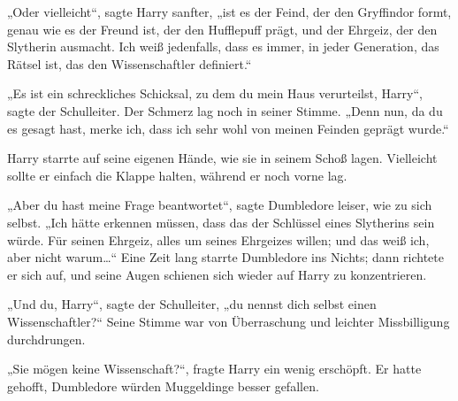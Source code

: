 „Oder vielleicht“, sagte Harry sanfter, „ist es der Feind, der den Gryffindor formt, genau wie es der Freund ist, der den Hufflepuff prägt, und der Ehrgeiz, der den Slytherin ausmacht. Ich weiß jedenfalls, dass es immer, in jeder Generation, das Rätsel ist, das den Wissenschaftler definiert.“

„Es ist ein schreckliches Schicksal, zu dem du mein Haus verurteilst, Harry“, sagte der Schulleiter. Der Schmerz lag noch in seiner Stimme. „Denn nun, da du es gesagt hast, merke ich, dass ich sehr wohl von meinen Feinden geprägt wurde.“

Harry starrte auf seine eigenen Hände, wie sie in seinem Schoß lagen. Vielleicht sollte er einfach die Klappe halten, während er noch vorne lag.

„Aber du hast meine Frage beantwortet“, sagte Dumbledore leiser, wie zu sich selbst. „Ich hätte erkennen müssen, dass das der Schlüssel eines Slytherins sein würde. Für seinen Ehrgeiz, alles um seines Ehrgeizes willen; und das weiß ich, aber nicht warum…“ Eine Zeit lang starrte Dumbledore ins Nichts; dann richtete er sich auf, und seine Augen schienen sich wieder auf Harry zu konzentrieren.

„Und du, Harry“, sagte der Schulleiter, „du nennst dich selbst einen Wissenschaftler?“ Seine Stimme war von Überraschung und leichter Missbilligung durchdrungen.

„Sie mögen keine Wissenschaft?“, fragte Harry ein wenig erschöpft. Er hatte gehofft, Dumbledore würden Muggeldinge besser gefallen.

